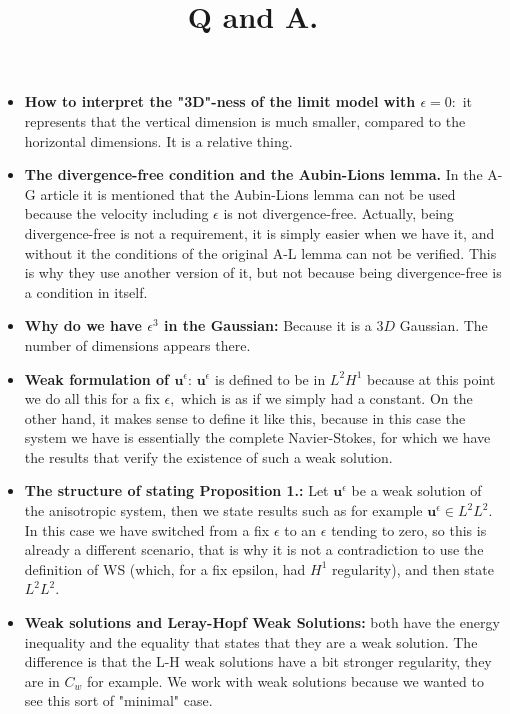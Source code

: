 \documentclass[11pt]{article}
\title{Q and A.}
\begin{document}
\maketitle

\begin{itemize}

\item \textbf{How to interpret the "3D"-ness of the limit model with $\epsilon = 0:$} it represents that the vertical dimension is much smaller, compared to the horizontal dimensions. It is a relative thing.

\item \textbf{The divergence-free condition and the Aubin-Lions lemma.} In the A-G article it is mentioned that the Aubin-Lions lemma can not be used because the velocity including $\epsilon$ is not divergence-free. Actually, being divergence-free is not a requirement, it is simply easier when we have it, and without it the conditions of the original A-L lemma can not be verified. This is why they use another version of it, but not because being divergence-free is a condition in itself.

\item \textbf{Why do we have $\epsilon^3$ in the Gaussian:} Because it is a $3D$ Gaussian. The number of dimensions appears there.

\item \textbf{Weak formulation of $\mathbf{u}^\epsilon$}: $\mathbf{u}^\epsilon$ is defined to be in $L^2 H^1$ because at this point we do all this for a fix $\epsilon,$ which is as if we simply had a constant. On the other hand, it makes sense to define it like this, because in this case the system we have is essentially the complete Navier-Stokes, for which we have the results that verify the existence of such a weak solution.

\item \textbf{The structure of stating Proposition 1.:} Let $\mathbf{u}^\epsilon$ be a weak solution of the anisotropic system, then we state results such as for example $\mathbf{u}^\epsilon \in L^2 L^2.$ In this case we have switched from a fix $\epsilon$ to an $\epsilon$ tending to zero, so this is already a different scenario, that is why it is not a contradiction to use the definition of WS (which, for a fix epsilon, had $H^1$ regularity), and then state $L^2 L^2.$

\item \textbf{Weak solutions and Leray-Hopf Weak Solutions:} both have the energy inequality and the equality that states that they are a weak solution. The difference is that the L-H weak solutions have a bit stronger regularity, they are in $C_w$ for example. We work with weak solutions because we wanted to see this sort of "minimal" case.


\end{itemize}
\end{document}

